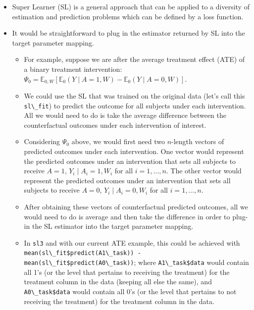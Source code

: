 \documentclass[
  12pt, krantz2,
]{book}
\newcommand{\passthrough}[1]{#1}
\providecommand{\tightlist}{%
  \setlength{\itemsep}{0pt}\setlength{\parskip}{0pt}}
\theoremstyle{definition}
\theoremstyle{definition}
\theoremstyle{definition}
\newcommand{\1}{\mathbbm{1}}
\begin{document}
\begin{itemize}
\item
  Super Learner (SL) is a general approach that can be applied to a diversity of
  estimation and prediction problems which can be defined by a loss function.
\item
  It would be straightforward to plug in the estimator returned by SL into the
  target parameter mapping.

  \begin{itemize}
  \tightlist
  \item
    For example, suppose we are after the average treatment effect (ATE) of a
    binary treatment intervention:
    \(\Psi_0 = \mathbb{E}_{0,W}[\mathbb{E}_0(Y \mid A=1,W) -  \mathbb{E}_0(Y \mid A=0,W)]\).
  \item
    We could use the SL that was trained on the original data (let's call
    this \passthrough{\lstinline!sl\_fit!}) to predict the outcome for all subjects under each
    intervention. All we would need to do is take the average difference
    between the counterfactual outcomes under each intervention of interest.
  \item
    Considering \(\Psi_0\) above, we would first need two \(n\)-length vectors of
    predicted outcomes under each intervention. One vector would represent the
    predicted outcomes under an intervention that sets all subjects to
    receive \(A=1\), \(Y_i \mid A_i=1,W_i\) for all \(i=1,\ldots,n\). The other
    vector would represent the predicted outcomes under an intervention that
    sets all subjects to receive \(A=0\), \(Y_i \mid A_i=0,W_i\) for all
    \(i=1,\ldots,n\).
  \item
    After obtaining these vectors of counterfactual predicted outcomes, all
    we would need to do is average and then take the difference in order to
    plug-in the SL estimator into the target parameter mapping.
  \item
    In \passthrough{\lstinline!sl3!} and with our current ATE example, this could be achieved with
    \passthrough{\lstinline!mean(sl\_fit$predict(A1\_task)) - mean(sl\_fit$predict(A0\_task))!};
    where \passthrough{\lstinline!A1\_task$data!} would contain all 1's (or the level that pertains to
    receiving the treatment) for the treatment column in the data (keeping all
    else the same), and \passthrough{\lstinline!A0\_task$data!} would contain all 0's (or the level
    that pertains to not receiving the treatment) for the treatment column in
    the data.
  \end{itemize}

\end{itemize}
\end{document}
